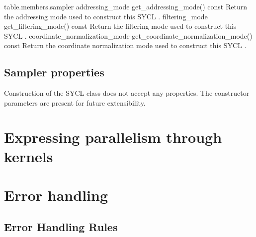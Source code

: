 {table.members.sampler}
  \addRow
    {addressing_mode get_addressing_mode() const}
    {
       Return the addressing mode used to construct this SYCL .
    }
  \addRow
    {filtering_mode get_filtering_mode() const}
    {
        Return the filtering mode used to construct this SYCL .
    }
  \addRow
    {coordinate_normalization_mode get_coordinate_normalization_mode() const}
    {
       Return the coordinate normalization mode used to construct this SYCL .
    }
\completeTable


\subsection{Sampler properties}
\label{sec:sampler-properties}

Construction of the SYCL  class does not accept any properties.
The  constructor parameters are present for future extensibility.

\section{Expressing parallelism through kernels}
\label{sec:expr-parall-thro}



\section{Error handling}
\label{error-handling}

\subsection{Error Handling Rules}


